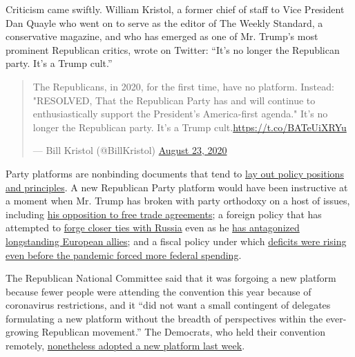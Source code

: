 Criticism came swiftly. William Kristol, a former chief of staff to Vice
President Dan Quayle who went on to serve as the editor of The Weekly
Standard, a conservative magazine, and who has emerged as one of Mr.
Trump's most prominent Republican critics, wrote on Twitter: ``It's no
longer the Republican party. It's a Trump cult.''

\begin{quote}
The Republicans, in 2020, for the first time, have no platform. Instead:
"RESOLVED, That the Republican Party has and will continue to
enthusiastically support the President's America-first agenda." It's no
longer the Republican party. It's a Trump
cult.\url{https://t.co/BATeUiXRYu}

--- Bill Kristol (@BillKristol)
\href{https://twitter.com/BillKristol/status/1297656400022208512?ref_src=twsrc\%5Etfw}{August
23, 2020}
\end{quote}

Party platforms are nonbinding documents that tend to
\href{https://www.nytimes3xbfgragh.onion/2012/08/29/us/politics/republican-platform-takes-turn-to-right.html}{lay
out policy positions and principles}. A new Republican Party platform
would have been instructive at a moment when Mr. Trump has broken with
party orthodoxy on a host of issues, including
\href{https://www.nytimes3xbfgragh.onion/2019/08/21/us/politics/deficit-will-reach-1-trillion-next-year-budget-office-predicts.html}{his
opposition to free trade agreements}; a foreign policy that has
attempted to
\href{https://www.nytimes3xbfgragh.onion/2018/07/16/us/politics/republicans-trump-putin.html}{forge
closer ties with Russia} even as he
\href{https://www.nytimes3xbfgragh.onion/2020/06/06/world/europe/germany-troop-withdrawal-america.html}{has
antagonized longstanding European allies}; and a fiscal policy under
which
\href{https://www.nytimes3xbfgragh.onion/2019/08/21/us/politics/deficit-will-reach-1-trillion-next-year-budget-office-predicts.html}{deficits
were rising even before the pandemic forced more federal spending}.

The Republican National Committee said that it was forgoing a new
platform because fewer people were attending the convention this year
because of coronavirus restrictions, and it ``did not want a small
contingent of delegates formulating a new platform without the breadth
of perspectives within the ever-growing Republican movement.'' The
Democrats, who held their convention remotely,
\href{https://www.nytimes3xbfgragh.onion/2020/08/19/us/elections/the-democrats-approved-a-platform-setting-out-the-partys-agenda.html}{nonetheless
adopted a new platform last week}.

